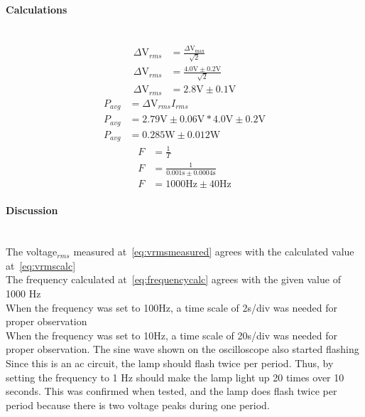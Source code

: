 \documentclass{report}
\begin{document}
\paragraph{Calculations}\mbox{}\\
\begin{align}
    \Delta\si{\volt}_{rms}&=\frac{\Delta\si{\volt}_{\max}}{\sqrt{2}} \nonumber\\
    \Delta\si{\volt}_{rms}&=\frac{4.0\si{\volt}\pm0.2\si{\volt}}{\sqrt{2}}\nonumber\\
    \Delta\si{\volt}_{rms}&=2.8\si{\volt}\pm0.1\si{\volt} \label{eq:vrmscalc}
\end{align}
\begin{align}
    P_{avg}&=\Delta\si{\volt}_{rms}I_{rms}\nonumber\\
    P_{avg}&=2.79\si{\volt}\pm0.06\si{\volt} * 4.0\si{\volt}\pm0.2\si{\volt} \nonumber\\ 
    P_{avg}&=0.285\si{\watt}\pm0.012\si{\watt}
\end{align}
\begin{align}
    F&=\frac{1}{T} \nonumber\\
    F &=\frac{1}{0.001 \si{\second} \pm 0.0004 \si{\second} }\nonumber\\ 
    F &=1000\si{\hertz} \pm 40\si{\hertz} \label{eq:frequencycalc}
\end{align}
\paragraph{Discussion}\mbox{}\\
The voltage$_{rms}$ measured at~\eqref{eq:vrmsmeasured} agrees with the calculated value at~\eqref{eq:vrmscalc}\\
The frequency calculated at~\eqref{eq:frequencycalc} agrees with the given value of 1000 \si{\hertz}\\
When the frequency was set to 100\si{\hertz}, a time scale of 2\si{\milli}\si{\second}/div was needed for proper observation\\
When the frequency was set to 10\si{\hertz}, a time scale of 20\si{\milli}\si{\second}/div was needed for proper observation. The sine wave shown on the oscilloscope also started flashing\\
Since this is an ac circuit, the lamp should flash twice per period. Thus, by setting the frequency to 1 \si{\hertz} should make the lamp light up 20 times over 10 seconds. This was confirmed when tested, and the lamp does flash twice per period because there is two voltage peaks during one period.
\end{document}
